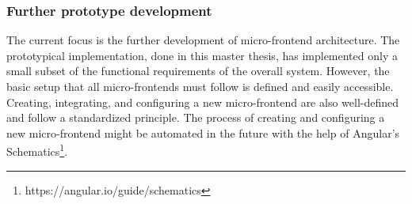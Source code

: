 \subsubsection{Further prototype development}

The current focus is the further development of micro-frontend architecture. The prototypical implementation, done in this master thesis, has implemented only a small subset of the functional requirements of the overall system. However, the basic setup that all micro-frontends must follow is defined and easily accessible. Creating, integrating, and configuring a new micro-frontend are also well-defined and follow a standardized principle. The process of creating and configuring a new micro-frontend might be automated in the future with the help of Angular's Schematics\footnote{https://angular.io/guide/schematics}.
